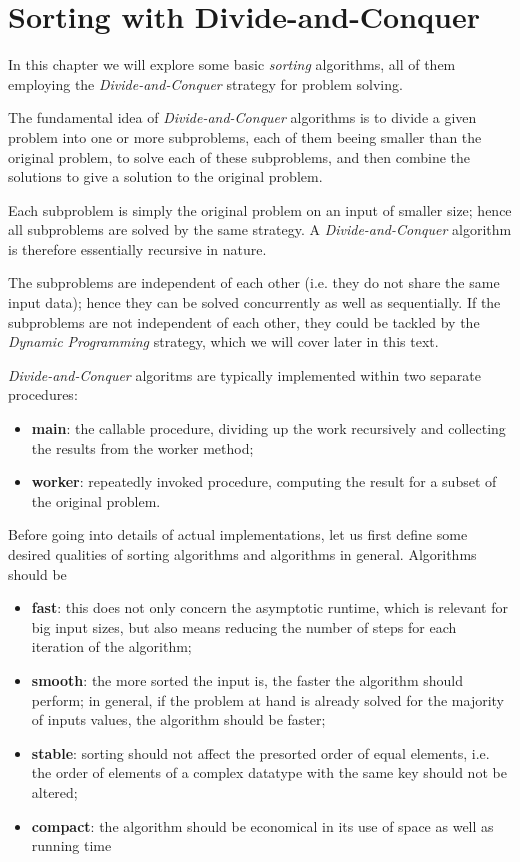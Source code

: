 \chapter{Sorting with Divide-and-Conquer}

In this chapter we will explore some basic \emph{sorting} algorithms, all of them employing the \emph{Divide-and-Conquer} strategy for problem solving.

The fundamental idea of \emph{Divide-and-Conquer} algorithms is to divide a given problem into one or more subproblems, each of them beeing smaller than the original problem, to solve each of these subproblems, and then combine the solutions to give a solution to the original problem.

Each subproblem is simply the original problem on an input of smaller size; hence all subproblems are solved by the same strategy. A \emph{Divide-and-Conquer} algorithm is therefore essentially recursive in nature.

The subproblems are independent of each other (i.e. they do not share the same input data); hence they can be solved concurrently as well as sequentially. If the subproblems are not independent of each other, they could be tackled by the \emph{Dynamic Programming} strategy, which we will cover later in this text.

\emph{Divide-and-Conquer} algoritms are typically implemented within two separate procedures:
\begin{itemize}
\item \textbf{main}: the callable procedure, dividing up the work recursively and collecting the results from the worker method;
\item \textbf{worker}: repeatedly invoked procedure, computing the result for a subset of the original problem.
\end{itemize}

Before going into details of actual implementations, let us first define some desired qualities of sorting algorithms and algorithms in general. Algorithms should be
\begin{itemize}
\item \textbf{fast}: this does not only concern the asymptotic runtime, which is relevant for big input sizes, but also means reducing the number of steps for each iteration of the algorithm; 
\item \textbf{smooth}: the more sorted the input is, the faster the algorithm should perform; in general, if the problem at hand is already solved for the majority of inputs values, the algorithm should be faster;
\item \textbf{stable}: sorting should not affect the presorted order of equal elements, i.e. the order of elements of a complex datatype with the same key should not be altered;
\item \textbf{compact}: the algorithm should be economical in its use of space as well as running time
\end{itemize}

